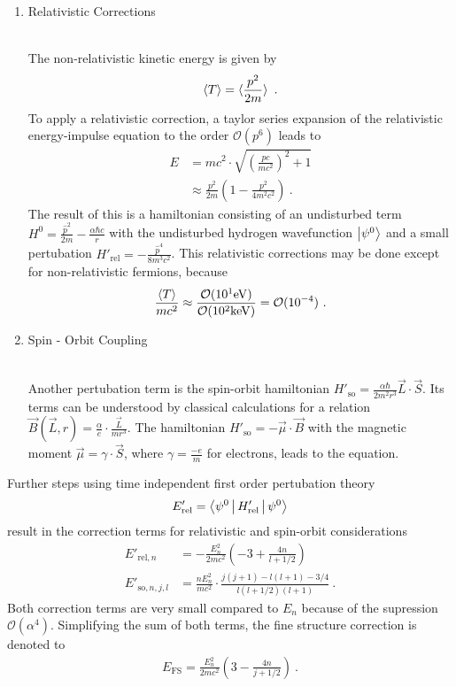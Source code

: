 	\begin{enumerate}
	\item{
	\begin{bf}Relativistic Corrections\end{bf}\\
	The non-relativistic kinetic energy is given by 
	\begin{align*}
	\Braket{T} = \braket{\frac{p^2}{2m}}\ .
	\end{align*} 
	To apply a relativistic correction, a taylor series expansion of the relativistic energy-impulse equation to the order $\mathcal{O}(p^6)$ leads to
	\begin{align*}
	E 	&= mc^2\cdot\sqrt{\left(\frac{pc}{mc^2}\right)^2+1}\\
		&\approx \frac{p^2}{2m}\left(1 - \frac{p^2}{4 m^2c^2} \right)\ . 
	\end{align*}
	The result of this is a hamiltonian consisting of an undisturbed term $H^0=\frac{\hat{p}^2}{{2m}} - \frac{\alpha\hbar c}{r}$ with the undisturbed hydrogen wavefunction $\Ket{\psi^0}$ and a small \linebreak
	pertubation $H'_\text{rel} = - \frac{\hat{p}^4}{8m^3c^2}$.
	This relativistic corrections may be done except for non-relativistic fermions, because 
	\begin{align*}
	\frac{\Braket{T}}{mc^2} \approx \frac{\mathcal{O}(10^1\si{\electronvolt})}{\mathcal{O}(10^2\si{\kilo\electronvolt})} = \mathcal{O}(10^{-4})\ .
	\end{align*}
	}
	
	\item{
	\begin{bf}Spin - Orbit Coupling\end{bf}\\
	Another pertubation term is the spin-orbit hamiltonian $H'_{\text{so}}=\frac{\alpha \hbar}{2 m^2r^3} \vec{L}\cdot\vec{S}$. 
	Its terms can be understood by classical calculations for a relation $\vec{B}(\vec{L},r) = \frac{\alpha}{e}\cdot \frac{\vec{L}}{m r^3}$.
	The hamiltonian $H'_{\text{so}}=-\vec{\mu}\cdot\vec{B}$ with the magnetic moment $\vec{\mu}=\gamma\cdot\vec{S}$, where $\gamma=\frac{-e}{m}$ for electrons, leads to the equation.
	}		
	\end{enumerate}
Further steps using time independent first order pertubation theory
\begin{align}
	E'_{\text{rel}} = \Braket{\psi^0 | H'_{\text{rel}} | \psi^0}
\end{align}
result in the correction terms for relativistic and spin-orbit considerations
	\begin{align}
	E'_{\text{rel},n} 	&= - \frac{E_n^2}{2 m c^2}\left( -3 + \frac{4n}{l + 1/2}\right)\\
	E'_{\text{so},n,j,l}	&= \frac{n E_n^2}{mc^2}\cdot\frac{j(j+1) - l(l+1) - 3/4}{l(l+1/2)(l+1)}\ .
	\end{align}
Both correction terms are very small compared to $E_n$ because of the supression $\mathcal{O}(\alpha^4)$.
Simplifying the sum of both terms, the fine structure correction is denoted to
	\begin{align}
	E_{\text{FS}} = \frac{E_n^2}{2mc^2}\left(3-\frac{4n}{j+1/2}\right) \ .
	\end{align}
